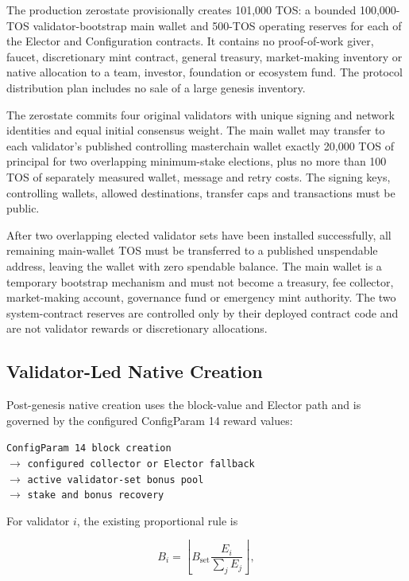 \documentclass[11pt,oneside]{article}
\begin{document}
The production zerostate provisionally creates 101,000
TOS: a bounded 100,000-TOS
validator-bootstrap main wallet and 500-TOS operating reserves for each of the Elector and
Configuration contracts. It contains no proof-of-work giver, faucet, discretionary mint
contract, general treasury, market-making inventory or native allocation to a team,
investor, foundation or ecosystem fund. The protocol distribution plan includes no sale of
a large genesis inventory.

The zerostate commits four original validators with unique signing and network identities
and equal initial consensus weight. The main wallet may transfer to each validator's
published controlling masterchain wallet exactly 20,000 TOS of principal for two overlapping
minimum-stake elections, plus no more than 100 TOS of separately measured wallet,
message and retry costs. The signing keys, controlling wallets, allowed destinations,
transfer caps and transactions must be public.

After two overlapping elected validator sets have been installed successfully, all remaining
main-wallet TOS must be transferred to a published unspendable address, leaving the wallet
with zero spendable balance. The main wallet is a temporary bootstrap mechanism and must not
become a treasury, fee collector, market-making account, governance fund or emergency mint
authority. The two system-contract reserves are controlled only by their deployed contract
code and are not validator rewards or discretionary allocations.

\subsection{Validator-Led Native Creation}

Post-genesis native creation uses the block-value and Elector path and is governed by the
configured ConfigParam 14 reward values:

\begin{center}
\texttt{ConfigParam 14 block creation}\\
$\longrightarrow$ \texttt{configured collector or Elector fallback}\\
$\longrightarrow$ \texttt{active validator-set bonus pool}\\
$\longrightarrow$ \texttt{stake and bonus recovery}
\end{center}

For validator $i$, the existing proportional rule is

\[
  B_i =
  \left\lfloor
    B_{\mathrm{set}}\frac{E_i}{\sum_j E_j}
  \right\rfloor,
\]
\end{document}
